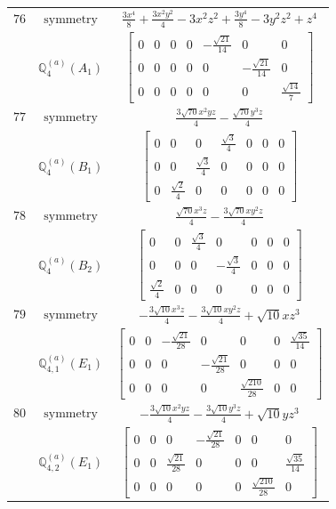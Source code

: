 \documentclass[fleqn,8pt,landscape]{jsarticle}
\begin{document}
\begin{longtable}{ccc}
$ 76 $ & $ \text{symmetry} $ & $ \frac{3 x^{4}}{8} + \frac{3 x^{2} y^{2}}{4} - 3 x^{2} z^{2} + \frac{3 y^{4}}{8} - 3 y^{2} z^{2} + z^{4} $ \\
$  $ & $ \mathbb{Q}_{4}^{(a)}(A_{1}) $ & $ \begin{bmatrix} 0 & 0 & 0 & 0 & - \frac{\sqrt{21}}{14} & 0 & 0 \\ 0 & 0 & 0 & 0 & 0 & - \frac{\sqrt{21}}{14} & 0 \\ 0 & 0 & 0 & 0 & 0 & 0 & \frac{\sqrt{14}}{7} \end{bmatrix} $ \\ \hline
$ 77 $ & $ \text{symmetry} $ & $ \frac{3 \sqrt{70} x^{2} y z}{4} - \frac{\sqrt{70} y^{3} z}{4} $ \\
$  $ & $ \mathbb{Q}_{4}^{(a)}(B_{1}) $ & $ \begin{bmatrix} 0 & 0 & 0 & \frac{\sqrt{3}}{4} & 0 & 0 & 0 \\ 0 & 0 & \frac{\sqrt{3}}{4} & 0 & 0 & 0 & 0 \\ 0 & \frac{\sqrt{2}}{4} & 0 & 0 & 0 & 0 & 0 \end{bmatrix} $ \\ \hline
$ 78 $ & $ \text{symmetry} $ & $ \frac{\sqrt{70} x^{3} z}{4} - \frac{3 \sqrt{70} x y^{2} z}{4} $ \\
$  $ & $ \mathbb{Q}_{4}^{(a)}(B_{2}) $ & $ \begin{bmatrix} 0 & 0 & \frac{\sqrt{3}}{4} & 0 & 0 & 0 & 0 \\ 0 & 0 & 0 & - \frac{\sqrt{3}}{4} & 0 & 0 & 0 \\ \frac{\sqrt{2}}{4} & 0 & 0 & 0 & 0 & 0 & 0 \end{bmatrix} $ \\ \hline
$ 79 $ & $ \text{symmetry} $ & $ - \frac{3 \sqrt{10} x^{3} z}{4} - \frac{3 \sqrt{10} x y^{2} z}{4} + \sqrt{10} x z^{3} $ \\
$  $ & $ \mathbb{Q}_{4,1}^{(a)}(E_{1}) $ & $ \begin{bmatrix} 0 & 0 & - \frac{\sqrt{21}}{28} & 0 & 0 & 0 & \frac{\sqrt{35}}{14} \\ 0 & 0 & 0 & - \frac{\sqrt{21}}{28} & 0 & 0 & 0 \\ 0 & 0 & 0 & 0 & \frac{\sqrt{210}}{28} & 0 & 0 \end{bmatrix} $ \\ \hline
$ 80 $ & $ \text{symmetry} $ & $ - \frac{3 \sqrt{10} x^{2} y z}{4} - \frac{3 \sqrt{10} y^{3} z}{4} + \sqrt{10} y z^{3} $ \\
$  $ & $ \mathbb{Q}_{4,2}^{(a)}(E_{1}) $ & $ \begin{bmatrix} 0 & 0 & 0 & - \frac{\sqrt{21}}{28} & 0 & 0 & 0 \\ 0 & 0 & \frac{\sqrt{21}}{28} & 0 & 0 & 0 & \frac{\sqrt{35}}{14} \\ 0 & 0 & 0 & 0 & 0 & \frac{\sqrt{210}}{28} & 0 \end{bmatrix} $ \\ \hline

\end{longtable}
\end{document}

